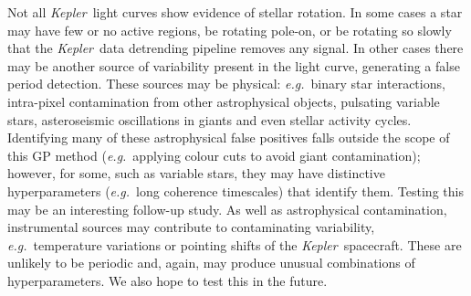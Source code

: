 \documentclass[a4paper,fleqn,usenatbib,useAMS]{mnras}
\newcommand{\Kepler}{{\it Kepler}}
\newcommand{\kepler}{\Kepler}
\newcommand{\eg}{{\it e.g.}}
\begin{document}
Not all \kepler\ light curves show evidence of stellar rotation.
In some cases a star may have few or no active regions, be rotating
pole-on, or be rotating so slowly that the \kepler\ data detrending pipeline
removes any signal.
In other cases there may be another source of variability present in the light
curve, generating a false period detection.
These sources may be physical: \eg\ binary star interactions, intra-pixel
contamination from other astrophysical objects, pulsating variable stars,
asteroseismic oscillations in giants and even stellar activity cycles.
Identifying many of these astrophysical false positives
falls outside the scope of this GP method
(\eg\ applying colour cuts to avoid giant contamination);
however, for some, such as variable stars, they may have distinctive
hyperparameters (\eg\ long coherence timescales) that identify them.
Testing this may be an interesting follow-up study.
As well as astrophysical contamination, instrumental sources may contribute
to contaminating variability, \eg\ temperature variations or pointing shifts
of the \kepler\ spacecraft.
These are unlikely to be periodic and, again, may produce unusual combinations
of hyperparameters.
We also hope to test this in the future.
\end{document}
